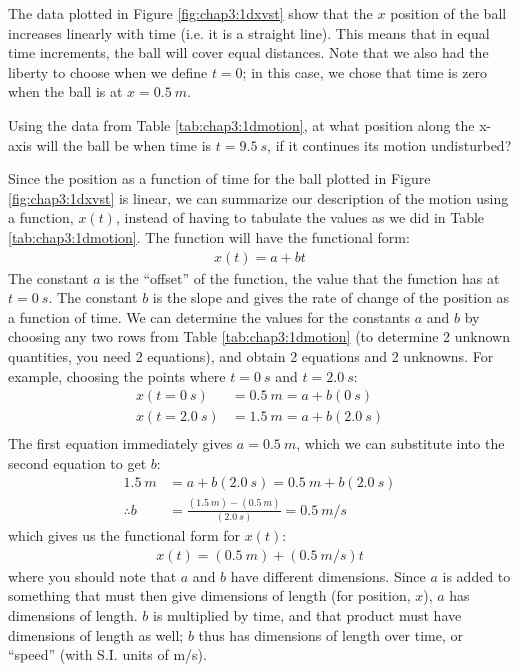 The data plotted in Figure \ref{fig:chap3:1dxvst} show that the $x$ position of the ball increases linearly with time (i.e. it is a straight line). This means that in equal time increments, the ball will cover equal distances. Note that we also had the liberty to choose when we define $t=0$; in this case, we chose that time is zero when the ball is at $x=\SI{0.5}{m}$. 

\begin{checkpointSA}{Using the data from Table \ref{tab:chap3:1dmotion}, at what position along the x-axis will the ball be when time is $t=\SI{9.5}{s}$, if it continues its motion undisturbed?} %
\end{checkpointSA} 

Since the position as a function of time for the ball plotted in Figure \ref{fig:chap3:1dxvst} is linear, we can summarize our description of the motion using a function, $x(t)$, instead of having to tabulate the values as we did in Table \ref{tab:chap3:1dmotion}. The function will have the functional form:
\begin{align*}
x(t) = a + b t
\end{align*}
The constant $a$ is the ``offset'' of the function, the value that the function has at $t=\SI{0}{s}$. The constant $b$ is the slope and gives the rate of change of the position as a function of time. We can determine the values for the constants $a$ and $b$ by choosing any two rows from Table \ref{tab:chap3:1dmotion} (to determine 2 unknown quantities, you need 2 equations), and obtain 2 equations and 2 unknowns. For example, choosing the points where $t=\SI{0}{s}$ and $t=\SI{2.0}{s}$:
\begin{align*}
x(t=\SI{0}{s})&=\SI{0.5}{m}=a + b(\SI{0}{s}) \\
x(t=\SI{2.0}{s})&=\SI{1.5}{m}=a + b(\SI{2.0}{s}) \\
\end{align*}
The first equation immediately gives $a = \SI{0.5}{m}$, which we can substitute into the second equation to get $b$:
\begin{align*}
\SI{1.5}{m}&=a + b(\SI{2.0}{s}) = \SI{0.5}{m} + b(\SI{2.0}{s})\\
\therefore b &=\frac{(\SI{1.5}{m})-(\SI{0.5}{m})}{(\SI{2.0}{s})}=\SI{0.5}{m/s}
\end{align*}
which gives us the functional form for $x(t)$:
\begin{align*}
x(t) = (\SI{0.5}{m}) + (\SI{0.5}{m/s}) t
\end{align*}
where you should note that $a$ and $b$ have different dimensions. Since $a$ is added to something that must then give dimensions of length (for position, $x$), $a$ has dimensions of length. $b$ is multiplied by time, and that product must have dimensions of length as well; $b$ thus has dimensions of length over time, or ``speed'' (with S.I. units of \si{m/s}).


